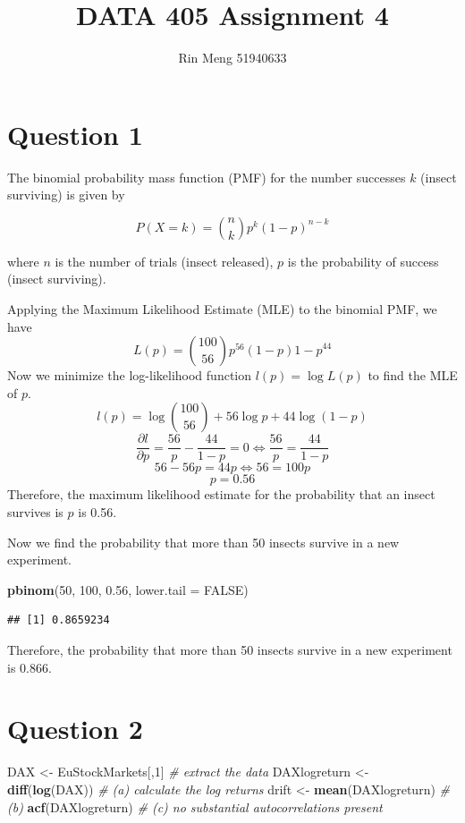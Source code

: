 \documentclass[
]{article}
\title{DATA 405 Assignment 4}
\author{Rin Meng 51940633}
\date{}
\newenvironment{Shaded}{\begin{snugshade}}{\end{snugshade}}
\newcommand{\AttributeTok}[1]{\textcolor[rgb]{0.13,0.29,0.53}{#1}}
\newcommand{\CommentTok}[1]{\textcolor[rgb]{0.56,0.35,0.01}{\textit{#1}}}
\newcommand{\ConstantTok}[1]{\textcolor[rgb]{0.56,0.35,0.01}{#1}}
\newcommand{\DecValTok}[1]{\textcolor[rgb]{0.00,0.00,0.81}{#1}}
\newcommand{\FloatTok}[1]{\textcolor[rgb]{0.00,0.00,0.81}{#1}}
\newcommand{\FunctionTok}[1]{\textcolor[rgb]{0.13,0.29,0.53}{\textbf{#1}}}
\newcommand{\NormalTok}[1]{#1}
\newcommand{\OtherTok}[1]{\textcolor[rgb]{0.56,0.35,0.01}{#1}}
\begin{document}
\maketitle

\section{Question 1}\label{question-1}

The binomial probability mass function (PMF) for the number successes
\(k\) (insect surviving) is given by

\[P(X=k) = \binom{n}{k} p^k (1-p)^{n-k}\]

where \(n\) is the number of trials (insect released), \(p\) is the
probability of success (insect surviving).

Applying the Maximum Likelihood Estimate (MLE) to the binomial PMF, we
have \[L(p) = \binom{100}{56} p^{56} (1-p){1-p}^{44}\] Now we minimize
the log-likelihood function \(l(p) = \log L(p)\) to find the MLE of
\(p\). \[l(p) = \log \binom{100}{56} + 56 \log p + 44 \log (1-p)\]
\[\frac{\partial l}{\partial p} = \frac{56}{p} - \frac{44}{1-p} = 0 \Leftrightarrow \frac{56}{p} = \frac{44}{1-p}\]
\[56 - 56p = 44p \Leftrightarrow 56 = 100p\] \[p = 0.56\] Therefore, the
maximum likelihood estimate for the probability that an insect survives
is \(p\) is 0.56.

Now we find the probability that more than 50 insects survive in a new
experiment.

\begin{Shaded}
\begin{Highlighting}[]
\FunctionTok{pbinom}\NormalTok{(}\DecValTok{50}\NormalTok{, }\DecValTok{100}\NormalTok{, }\FloatTok{0.56}\NormalTok{, }\AttributeTok{lower.tail =} \ConstantTok{FALSE}\NormalTok{)}
\end{Highlighting}
\end{Shaded}

\begin{verbatim}
## [1] 0.8659234
\end{verbatim}

Therefore, the probability that more than 50 insects survive in a new
experiment is 0.866.

\section{Question 2}\label{question-2}

\begin{Shaded}
\begin{Highlighting}[]
\NormalTok{DAX }\OtherTok{\textless{}{-}}\NormalTok{ EuStockMarkets[,}\DecValTok{1}\NormalTok{] }\CommentTok{\# extract the data}
\NormalTok{DAXlogreturn }\OtherTok{\textless{}{-}} \FunctionTok{diff}\NormalTok{(}\FunctionTok{log}\NormalTok{(DAX)) }\CommentTok{\# (a) calculate the log returns}
\NormalTok{drift }\OtherTok{\textless{}{-}} \FunctionTok{mean}\NormalTok{(DAXlogreturn) }\CommentTok{\# (b)}
\FunctionTok{acf}\NormalTok{(DAXlogreturn) }\CommentTok{\# (c) no substantial autocorrelations present}
\end{Highlighting}
\end{Shaded}
\end{document}
